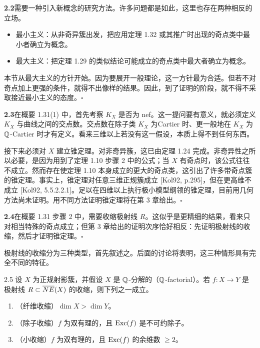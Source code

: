 \par\medskip\noindent\textbf{2.2}\quad 需要一种引入新概念的研究方法。许多问题都是如此，这里也存在两种相反的立场。
\begin{itemize}[leftmargin=2.2em,itemsep=2pt]
\item 最小主义：从非奇异簇出发，把应用定理 1.32 或其推广时出现的奇点类中最小者确立为概念。
\item 最大主义：把定理 1.29 的类似结论可能成立的奇点类中最大者确立为概念。
\end{itemize}

本节从最大主义的方针开始。因为要展开一般理论，这一方针最为合适。但若不对奇点加上更强的条件，就得不出像样的结果。因此，到了证明的阶段，就不得不采取接近最小主义的态度。\hfill$\square$

\par\medskip\noindent\textbf{2.3}\quad 在概要 1.31(1) 中，首先考察 $K_X$ 是否为 nef。这一提问要有意义，就必须定义 $K_X$ 与曲线之间的交点数。交点数在除子类 $K_X$ 为Cartier 时、更一般地在 $K_X$ 为 $\mathbb{Q}$-Cartier 时才有定义。看来三维以上若没有这一假设，本质上得不到任何东西。

接下来必须对 $X$ 建立锥定理。对非奇异簇，这已由定理 1.24 完成。非奇异性之所以必要，是因为用到了定理 1.10 步骤 2 中的公式；当 $X$ 有奇点时，该公式往往不成立。然而存在使定理 1.10 本身成立的更大的奇点类，这引出了许多带奇点簇的锥定理。事实上，锥定理对任意三维正规簇成立 [Kol92, p.295]，但在更高维不成立 [Kol92, 5.5.2.2.1]。足以在四维以上执行极小模型纲领的锥定理，目前用几何方法尚未证明。用不同方法证明锥定理将在第 3 章给出。\hfill$\square$

\par\medskip\noindent\textbf{2.4}\quad 在概要 1.31 步骤 2 中，需要收缩极射线 $R$。这似乎是更精细的结果，看来只对相当特殊的奇点成立；但第 3 章给出的证明次序恰好相反：先证明极射线的收缩，然后才证明锥定理。\hfill$\square$

极射线的收缩分为三种类型，首先叙述之。后面的讨论将表明，这三种情形具有完全不同的特征。

\begin{propositionp}{2.5}
设 $X$ 为正规射影簇，并假设 $X$ 是 $\mathbb{Q}$-分解的（$\mathbb{Q}$-factorial）。若 $f\colon X\to Y$ 是极射线 $R\subset\overline{NE}(X)$ 的收缩，则下列之一成立。
\begin{enumerate}[label=（\arabic*）,leftmargin=2.6em,itemsep=1pt]
\item （纤维收缩）$\dim X>\dim Y$。
\item （除子收缩）$f$ 为双有理的，且 $\operatorname{Exc}(f)$ 是不可约除子。
\item （小收缩）$f$ 为双有理的，且 $\operatorname{Exc}(f)$ 的余维数 $\ge 2$。
\end{enumerate}
\end{propositionp}

